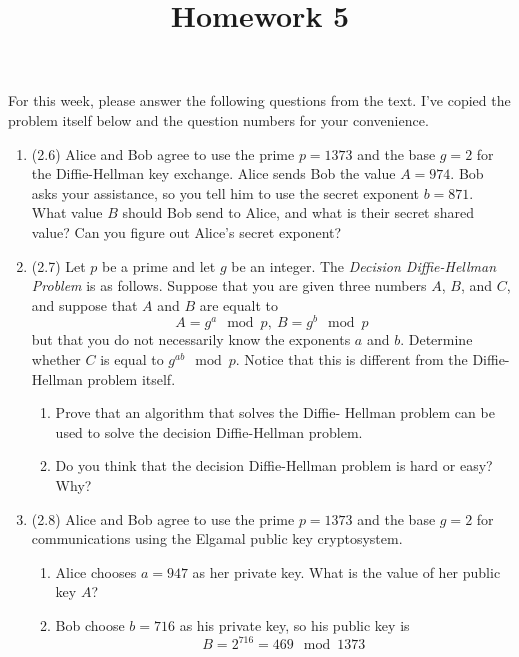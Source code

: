 \documentclass[12pt]{amsart}
\theoremstyle{definition}
\begin{document}
\title{Homework 5}

\maketitle

For this week, please answer the following questions from the text. 
I've copied the problem itself below and the question numbers for 
your convenience. 

\begin{enumerate}
	\item (2.6) Alice and Bob agree to use the prime $p=1373$ and 
		the base $g=2$ for the Diffie-Hellman key exchange. Alice 
		sends Bob the value $A = 974$. Bob asks your assistance, 
		so you tell him to use the secret exponent $b=871$. What 
		value $B$ should Bob send to Alice, and what is their 
		secret shared value? Can you figure out Alice's secret 
		exponent?
	\item (2.7) Let $p$ be a prime and let $g$ be an integer. The 
		\textit{Decision Diffie-Hellman Problem} is as follows. 
		Suppose that you are given three numbers $A$, $B$, and $C$, 
		and suppose that $A$ and $B$ are equalt to 
		\begin{displaymath}
			A = g^a \mod p, \ B = g^b \mod p
		\end{displaymath}
		but that you do not necessarily know the exponents $a$ and 
		$b$. Determine whether $C$ is equal to $g^{ab} \mod p$. Notice 
		that this is different from the Diffie-Hellman problem itself. 
		\begin{enumerate}
			\item Prove that an algorithm that solves the Diffie-
				Hellman problem can be used to solve the decision 
				Diffie-Hellman problem.
			\item Do you think that the decision Diffie-Hellman problem 
				is hard or easy? Why? 
		\end{enumerate}
	\item (2.8) Alice and Bob agree to use the prime $p=1373$ and the base 
		$g=2$ for communications using the Elgamal public key cryptosystem. 
		\begin{enumerate}
			\item Alice chooses $a=947$ as her private key. What is the 
				value of her public key $A$?
			\item Bob choose $b=716$ as his private key, so his public 
				key is 
				\begin{displaymath}
					B = 2^{716} = 469 \mod 1373
				\end{displaymath}

\end{enumerate}
\end{enumerate}
\end{document}
